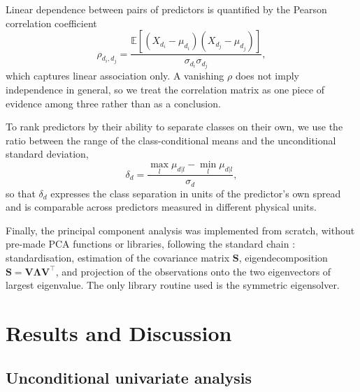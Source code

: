 \documentclass[conference]{IEEEtran}
\begin{document}
Linear dependence between pairs of predictors is quantified by the
Pearson correlation coefficient
\begin{equation}
\rho_{d_i,d_j} =
\frac{\mathbb{E}\left[(X_{d_i}-\mu_{d_i})(X_{d_j}-\mu_{d_j})\right]}
{\sigma_{d_i}\sigma_{d_j}},
\label{eq:pearson}
\end{equation}
which captures linear association only. A vanishing $\rho$ does not
imply independence in general, so we treat the correlation matrix as
one piece of evidence among three rather than as a conclusion.

To rank predictors by their ability to separate classes on their own,
we use the ratio between the range of the class-conditional means and
the unconditional standard deviation,
\begin{equation}
\delta_d = \frac{\max_l \mu_{d|l} - \min_l \mu_{d|l}}{\sigma_d},
\label{eq:discrim}
\end{equation}
so that $\delta_d$ expresses the class separation in units of the
predictor's own spread and is comparable across predictors measured in
different physical units.

Finally, the principal component analysis was implemented from
scratch, without pre-made PCA functions or libraries, following the
standard chain \cite{jolliffe2002}: standardisation, estimation of the
covariance matrix $\mathbf{S}$, eigendecomposition
$\mathbf{S} = \mathbf{V}\boldsymbol{\Lambda}\mathbf{V}^{\top}$, and
projection of the observations onto the two eigenvectors of largest
eigenvalue. The only library routine used is the symmetric
eigensolver.

\section{Results and Discussion}
\label{sec:results}

\subsection{Unconditional univariate analysis}
\label{subsec:uncond}
\end{document}
